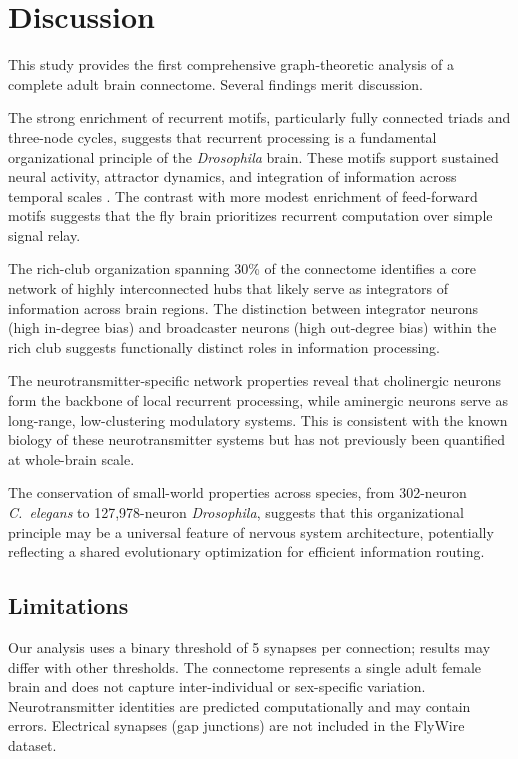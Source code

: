 \documentclass[11pt]{article}
\begin{document}
\section{Discussion}

This study provides the first comprehensive graph-theoretic analysis of a complete adult brain connectome. Several findings merit discussion.

The strong enrichment of recurrent motifs, particularly fully connected triads and three-node cycles, suggests that recurrent processing is a fundamental organizational principle of the \textit{Drosophila} brain. These motifs support sustained neural activity, attractor dynamics, and integration of information across temporal scales \citep{brunel2000dynamics}. The contrast with more modest enrichment of feed-forward motifs suggests that the fly brain prioritizes recurrent computation over simple signal relay.

The rich-club organization spanning 30\% of the connectome identifies a core network of highly interconnected hubs that likely serve as integrators of information across brain regions. The distinction between integrator neurons (high in-degree bias) and broadcaster neurons (high out-degree bias) within the rich club suggests functionally distinct roles in information processing.

The neurotransmitter-specific network properties reveal that cholinergic neurons form the backbone of local recurrent processing, while aminergic neurons serve as long-range, low-clustering modulatory systems. This is consistent with the known biology of these neurotransmitter systems but has not previously been quantified at whole-brain scale.

The conservation of small-world properties across species, from 302-neuron \textit{C.\ elegans} to 127,978-neuron \textit{Drosophila}, suggests that this organizational principle may be a universal feature of nervous system architecture, potentially reflecting a shared evolutionary optimization for efficient information routing.

\subsection{Limitations}
Our analysis uses a binary threshold of 5 synapses per connection; results may differ with other thresholds. The connectome represents a single adult female brain and does not capture inter-individual or sex-specific variation. Neurotransmitter identities are predicted computationally and may contain errors. Electrical synapses (gap junctions) are not included in the FlyWire dataset.
\end{document}

